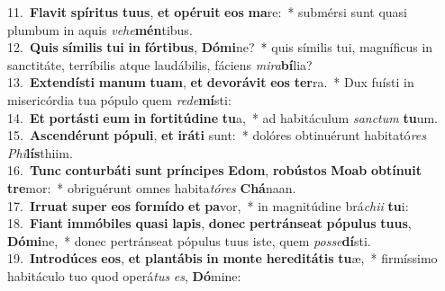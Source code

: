 {11.~}\textbf{Fla}\textbf{vit} \textbf{spí}\textbf{ri}\textbf{tus} \textbf{tu}\textbf{us}, \textbf{et} \textbf{o}\textbf{pé}\textbf{ru}\textbf{it} \textbf{e}\textbf{os} \textbf{ma}re:~* submérsi sunt quasi plumbum in aquis \textit{ve}\textit{he}\textbf{mén}tibus.\\
{12.~}\textbf{Quis} \textbf{sí}\textbf{mi}\textbf{lis} \textbf{tu}\textbf{i} \textbf{in} \textbf{fór}\textbf{ti}\textbf{bus}, \textbf{Dó}\textbf{mi}ne?~* quis símilis tui, magníficus in sanctitáte, terríbilis atque laudábilis, fáciens \textit{mi}\textit{ra}\textbf{bí}lia?\\
{13.~}\textbf{Ex}\textbf{ten}\textbf{dí}\textbf{sti} \textbf{ma}\textbf{num} \textbf{tu}\textbf{am}, \textbf{et} \textbf{de}\textbf{vo}\textbf{rá}\textbf{vit} \textbf{e}\textbf{os} \textbf{ter}ra.~* Dux fuísti in misericórdia tua pópulo quem \textit{re}\textit{de}\textbf{mí}sti:\\
{14.~}\textbf{Et} \textbf{por}\textbf{tá}\textbf{sti} \textbf{e}\textbf{um} \textbf{in} \textbf{for}\textbf{ti}\textbf{tú}\textbf{di}\textbf{ne} \textbf{tu}a,~* ad habitáculum \textit{san}\textit{ctum} \textbf{tu}um.\\
{15.~}\textbf{A}\textbf{scen}\textbf{dé}\textbf{runt} \textbf{pó}\textbf{pu}\textbf{li}, \textbf{et} \textbf{i}\textbf{rá}\textbf{ti} sunt:~* dolóres obtinuérunt habitató\textit{res} \textit{Phi}\textbf{lís}thiim.\\
{16.~}\textbf{Tunc} \textbf{con}\textbf{tur}\textbf{bá}\textbf{ti} \textbf{sunt} \textbf{prín}\textbf{ci}\textbf{pes} \textbf{E}\textbf{dom}, \textbf{ro}\textbf{bú}\textbf{stos} \textbf{Mo}\textbf{ab} \textbf{ob}\textbf{tí}\textbf{nu}\textbf{it} \textbf{tre}mor:~* obriguérunt omnes habita\textit{tó}\textit{res} \textbf{Chá}naan.\\
{17.~}\textbf{Ir}\textbf{ru}\textbf{at} \textbf{su}\textbf{per} \textbf{e}\textbf{os} \textbf{for}\textbf{mí}\textbf{do} \textbf{et} \textbf{pa}vor,~* in magnitúdine brá\textit{chi}\textit{i} \textbf{tu}i:\\
{18.~}\textbf{Fi}\textbf{ant} \textbf{im}\textbf{mó}\textbf{bi}\textbf{les} \textbf{qua}\textbf{si} \textbf{la}\textbf{pis}, \textbf{do}\textbf{nec} \textbf{per}\textbf{trán}\textbf{se}\textbf{at} \textbf{pó}\textbf{pu}\textbf{lus} \textbf{tu}\textbf{us}, \textbf{Dó}\textbf{mi}ne,~* donec pertránseat pópulus tuus iste, quem \textit{pos}\textit{se}\textbf{dí}sti.\\
{19.~}\textbf{In}\textbf{tro}\textbf{dú}\textbf{ces} \textbf{e}\textbf{os}, \textbf{et} \textbf{plan}\textbf{tá}\textbf{bis} \textbf{in} \textbf{mon}\textbf{te} \textbf{he}\textbf{re}\textbf{di}\textbf{tá}\textbf{tis} \textbf{tu}æ,~* firmíssimo habitáculo tuo quod operá\textit{tus} \textit{es}, \textbf{Dó}mine:\\
